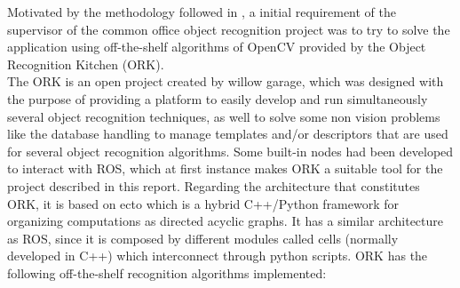 \documentclass[fontsize=12pt]{article}
\begin{document}
Motivated by the methodology followed in \cite{bib:semantic}, a initial requirement of the supervisor of the common office object recognition project was to try to solve the application using off-the-shelf algorithms of OpenCV \cite{bib:OCV} provided by the Object Recognition Kitchen (ORK).\\
The ORK is an open project created by willow garage, which was designed with the purpose of providing a platform to easily develop and run simultaneously several object recognition techniques, as well to solve some non vision problems like the database handling to manage templates and/or descriptors that are used for several object recognition algorithms.     
Some built-in nodes had been developed to interact with ROS, which at first instance makes ORK a suitable tool for the project described in this report. Regarding the architecture that constitutes ORK, it is based on ecto \cite{bib:ecto} which is a hybrid C++/Python framework for organizing computations as directed acyclic graphs. It has a similar architecture as ROS, since it is composed by different modules called cells (normally developed in C++) which interconnect through python scripts. 
ORK has the following off-the-shelf recognition algorithms implemented:
\end{document}
